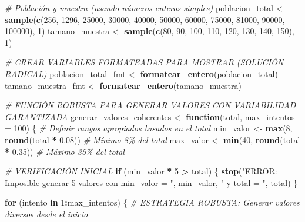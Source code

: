 \documentclass[
]{article}
\newenvironment{Shaded}{\begin{snugshade}}{\end{snugshade}}
\newcommand{\AttributeTok}[1]{\textcolor[rgb]{0.13,0.29,0.53}{#1}}
\newcommand{\CommentTok}[1]{\textcolor[rgb]{0.56,0.35,0.01}{\textit{#1}}}
\newcommand{\ControlFlowTok}[1]{\textcolor[rgb]{0.13,0.29,0.53}{\textbf{#1}}}
\newcommand{\DecValTok}[1]{\textcolor[rgb]{0.00,0.00,0.81}{#1}}
\newcommand{\FloatTok}[1]{\textcolor[rgb]{0.00,0.00,0.81}{#1}}
\newcommand{\FunctionTok}[1]{\textcolor[rgb]{0.13,0.29,0.53}{\textbf{#1}}}
\newcommand{\NormalTok}[1]{#1}
\newcommand{\OtherTok}[1]{\textcolor[rgb]{0.56,0.35,0.01}{#1}}
\newcommand{\SpecialCharTok}[1]{\textcolor[rgb]{0.81,0.36,0.00}{\textbf{#1}}}
\newcommand{\StringTok}[1]{\textcolor[rgb]{0.31,0.60,0.02}{#1}}
\begin{document}
\begin{Shaded}
\begin{Highlighting}[]
\CommentTok{\# Población y muestra (usando números enteros simples)}
\NormalTok{poblacion\_total }\OtherTok{\textless{}{-}} \FunctionTok{sample}\NormalTok{(}\FunctionTok{c}\NormalTok{(}\DecValTok{256}\NormalTok{, }\DecValTok{1296}\NormalTok{, }\DecValTok{25000}\NormalTok{, }\DecValTok{30000}\NormalTok{, }\DecValTok{40000}\NormalTok{, }\DecValTok{50000}\NormalTok{, }\DecValTok{60000}\NormalTok{, }\DecValTok{75000}\NormalTok{, }\DecValTok{81000}\NormalTok{, }\DecValTok{90000}\NormalTok{, }\DecValTok{100000}\NormalTok{), }\DecValTok{1}\NormalTok{)}
\NormalTok{tamano\_muestra }\OtherTok{\textless{}{-}} \FunctionTok{sample}\NormalTok{(}\FunctionTok{c}\NormalTok{(}\DecValTok{80}\NormalTok{, }\DecValTok{90}\NormalTok{, }\DecValTok{100}\NormalTok{, }\DecValTok{110}\NormalTok{, }\DecValTok{120}\NormalTok{, }\DecValTok{130}\NormalTok{, }\DecValTok{140}\NormalTok{, }\DecValTok{150}\NormalTok{), }\DecValTok{1}\NormalTok{)}

\CommentTok{\# CREAR VARIABLES FORMATEADAS PARA MOSTRAR (SOLUCIÓN RADICAL)}
\NormalTok{poblacion\_total\_fmt }\OtherTok{\textless{}{-}} \FunctionTok{formatear\_entero}\NormalTok{(poblacion\_total)}
\NormalTok{tamano\_muestra\_fmt }\OtherTok{\textless{}{-}} \FunctionTok{formatear\_entero}\NormalTok{(tamano\_muestra)}

\CommentTok{\# FUNCIÓN ROBUSTA PARA GENERAR VALORES CON VARIABILIDAD GARANTIZADA}
\NormalTok{generar\_valores\_coherentes }\OtherTok{\textless{}{-}} \ControlFlowTok{function}\NormalTok{(total, }\AttributeTok{max\_intentos =} \DecValTok{100}\NormalTok{) \{}
  \CommentTok{\# Definir rangos apropiados basados en el total}
\NormalTok{  min\_valor }\OtherTok{\textless{}{-}} \FunctionTok{max}\NormalTok{(}\DecValTok{8}\NormalTok{, }\FunctionTok{round}\NormalTok{(total }\SpecialCharTok{*} \FloatTok{0.08}\NormalTok{))  }\CommentTok{\# Mínimo 8\% del total}
\NormalTok{  max\_valor }\OtherTok{\textless{}{-}} \FunctionTok{min}\NormalTok{(}\DecValTok{40}\NormalTok{, }\FunctionTok{round}\NormalTok{(total }\SpecialCharTok{*} \FloatTok{0.35}\NormalTok{)) }\CommentTok{\# Máximo 35\% del total}

  \CommentTok{\# VERIFICACIÓN INICIAL}
  \ControlFlowTok{if}\NormalTok{ (min\_valor }\SpecialCharTok{*} \DecValTok{5} \SpecialCharTok{\textgreater{}}\NormalTok{ total) \{}
    \FunctionTok{stop}\NormalTok{(}\StringTok{"ERROR: Imposible generar 5 valores con min\_valor = "}\NormalTok{, min\_valor, }\StringTok{" y total = "}\NormalTok{, total)}
\NormalTok{  \}}

  \ControlFlowTok{for}\NormalTok{ (intento }\ControlFlowTok{in} \DecValTok{1}\SpecialCharTok{:}\NormalTok{max\_intentos) \{}
    \CommentTok{\# ESTRATEGIA ROBUSTA: Generar valores diversos desde el inicio}


\end{Highlighting}
\end{Shaded}
\end{document}
